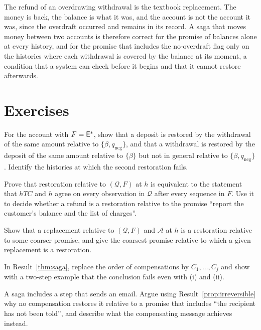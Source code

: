 The refund of an overdrawing withdrawal is the textbook replacement. The money is back, the balance is what it was, and the account is not the account it was, since the overdraft occurred and remains in its record. A saga that moves money between two accounts is therefore correct for the promise of balances alone at every history, and for the promise that includes the no-overdraft flag only on the histories where each withdrawal is covered by the balance at its moment, a condition that a system can check before it begins and that it cannot restore afterwards.

\section*{Exercises}

\begin{exercise}
For the account with $F=\mathsf{E}^{*}$, show that a deposit is restored by the withdrawal of the same amount relative to $\{\beta,q_{\mathrm{neg}}\}$, and that a withdrawal is restored by the deposit of the same amount relative to $\{\beta\}$ but not in general relative to $\{\beta,q_{\mathrm{neg}}\}$. Identify the histories at which the second restoration fails.\label{ex:restore-account}
\end{exercise}

\begin{exercise}
Prove that restoration relative to $(\mathcal Q,F)$ at $h$ is equivalent to the statement that $hTC$ and $h$ agree on every observation in $\mathcal Q$ after every sequence in $F$. Use it to decide whether a refund is a restoration relative to the promise ``report the customer's balance and the list of charges''.
\end{exercise}

\begin{exercise}
Show that a replacement relative to $(\mathcal Q,F)$ and $\mathcal A$ at $h$ is a restoration relative to some coarser promise, and give the coarsest promise relative to which a given replacement is a restoration.
\end{exercise}

\begin{exercise}
In Result~\ref{thm:saga}, replace the order of compensations by $C_1,\dots,C_j$ and show with a two-step example that the conclusion fails even with (i) and (ii).
\end{exercise}

\begin{exercise}
A saga includes a step that sends an email. Argue using Result~\ref{prop:irreversible} why no compensation restores it relative to a promise that includes ``the recipient has not been told'', and describe what the compensating message achieves instead.
\end{exercise}


